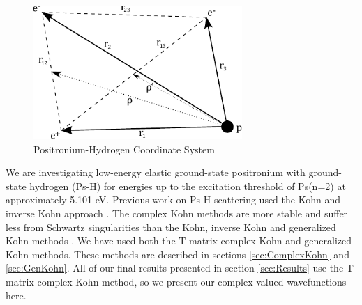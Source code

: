 \documentclass[preprint,showpacs,preprintnumbers,amsmath,amssymb]{revtex4}
\begin{document}
\begin{figure}[!h]
	\centering
	\includegraphics[height=2in]{PsHCoordinates}
	\caption{Positronium-Hydrogen Coordinate System}
	\label{fig:PsHCoords}
\end{figure}

We are investigating low-energy elastic ground-state positronium with ground-state hydrogen (Ps-H) for energies up to the excitation threshold of Ps(n=2) at approximately 5.101 eV. Previous work on Ps-H scattering used the Kohn and inverse Kohn approach \cite{VanReeth2003, VanReeth2004}. The complex Kohn methods are more stable and suffer less from Schwartz singularities than the Kohn, inverse Kohn and generalized Kohn methods \cite{Cooper2010}. We have used both the T-matrix complex Kohn and generalized Kohn methods. These methods are described in sections \ref{sec:ComplexKohn} and \ref{sec:GenKohn}. All of our final results presented in section \ref{sec:Results} use the T-matrix complex Kohn method, so we present our complex-valued wavefunctions here.
\end{document}
